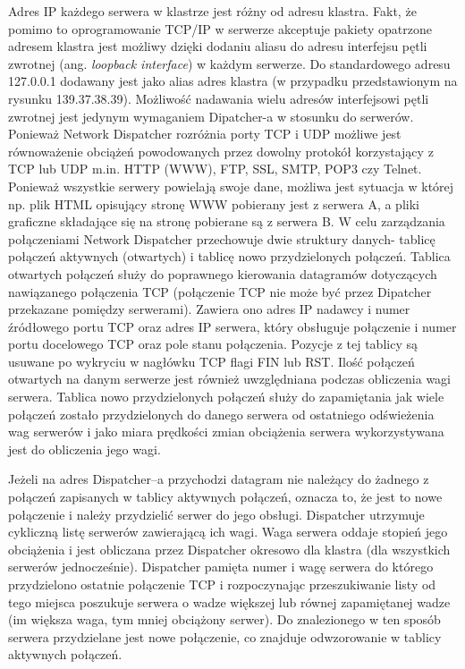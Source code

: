 Adres IP każdego serwera w klastrze jest różny od adresu klastra. Fakt, że pomimo to oprogramowanie 
TCP/IP w serwerze akceptuje pakiety opatrzone adresem klastra jest możliwy dzięki dodaniu aliasu do adresu 
interfejsu pętli zwrotnej (ang. \emph{loopback interface}) w każdym serwerze. Do standardowego adresu 127.0.0.1 
dodawany jest jako alias adres klastra (w przypadku przedstawionym na rysunku 139.37.38.39). Możliwość 
nadawania wielu adresów interfejsowi pętli zwrotnej jest jedynym wymaganiem Dipatcher-a w stosunku do serwerów.
Ponieważ Network Dispatcher rozróżnia porty TCP i UDP możliwe jest równoważenie obciążeń powodowanych 
przez dowolny protokół korzystający z TCP lub UDP m.in. HTTP (WWW), FTP, SSL, SMTP, POP3 czy Telnet. Ponieważ 
wszystkie serwery powielają swoje dane, możliwa jest sytuacja w której np. plik HTML opisujący stronę WWW 
pobierany jest z serwera A, a pliki graficzne składające się na stronę pobierane są z serwera B.
W celu zarządzania połączeniami Network Dispatcher przechowuje dwie struktury danych- tablicę połączeń 
aktywnych (otwartych) i tablicę nowo przydzielonych połączeń. Tablica otwartych połączeń służy do poprawnego 
kierowania datagramów dotyczących nawiązanego połączenia TCP (połączenie TCP nie może być przez Dipatcher 
przekazane pomiędzy serwerami). Zawiera ono adres IP nadawcy i numer źródłowego portu TCP oraz adres IP serwera, 
który obsługuje połączenie i numer portu docelowego TCP oraz pole stanu połączenia. Pozycje z tej tablicy są 
usuwane po wykryciu w nagłówku TCP flagi FIN lub RST. Ilość połączeń otwartych na danym serwerze jest również 
uwzględniana podczas obliczenia wagi serwera. Tablica nowo przydzielonych połączeń służy do zapamiętania jak 
wiele połączeń zostało przydzielonych do danego serwera od ostatniego odświeżenia wag serwerów i jako miara 
prędkości zmian obciążenia serwera wykorzystywana jest do obliczenia jego wagi.

Jeżeli na adres Dispatcher--a przychodzi datagram nie należący do żadnego z połączeń zapisanych w 
tablicy aktywnych połączeń, oznacza to, że jest to nowe połączenie i należy przydzielić serwer do jego obsługi. 
Dispatcher utrzymuje cykliczną listę serwerów zawierającą ich wagi. Waga serwera oddaje stopień jego obciążenia 
i jest obliczana przez Dispatcher okresowo dla klastra (dla wszystkich serwerów jednocześnie). Dispatcher 
pamięta numer i wagę serwera do którego przydzielono ostatnie połączenie TCP i rozpoczynając przeszukiwanie 
listy od tego miejsca poszukuje serwera o wadze większej lub równej zapamiętanej wadze (im większa waga, tym 
mniej obciążony serwer). Do znalezionego w ten sposób serwera przydzielane jest nowe połączenie, co znajduje 
odwzorowanie w tablicy aktywnych połączeń. 

